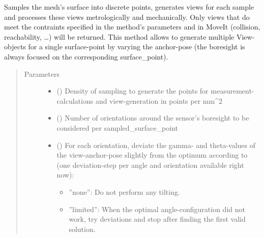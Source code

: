 \documentclass[letterpaper,10pt,english]{sphinxmanual}
\begin{document}
\begin{fulllineitems}
\begin{fulllineitems}
\label{\detokenize{module_trajectory_manager:agiprobot_measurement.trajectory_manager.TrajectoryManager.generate_samples_and_views}}
Samples the mesh’s surface into discrete points, generates views for each sample and processes these views metrologically and mechanically.
Only views that do meet the contraints specified in the method’s parameters and in MoveIt (collision, reachability, …) will be returned. This method allows to generate
multiple View-objects for a single surface-point by varying the anchor-pose (the boresight is always focused on the corresponding surface\_point).
\begin{quote}\begin{description}
\item[{Parameters}] \leavevmode\begin{itemize}
\item {} 
 () \textendash{} Density of sampling to generate the points for measurement-calculations and view-generation in points per mm\textasciicircum{}2

\item {} 
 () \textendash{} Number of orientations around the sensor’s boresight to be considered per sampled\_surface\_point

\item {} 
 (\sphinxstyleliteralemphasis{, }) \textendash{} 
For each orientation, deviate the gamma- and theta-values of the view-anchor-pose slightly from the optimum according to (one deviation-step per angle and orientation available right now):
\begin{itemize}
\item {} 
”none”: Do not perform any tilting.

\item {} 
”limited”: When the optimal angle-configuration did not work, try deviations and stop after finding the first valid solution.


\end{itemize}
\end{itemize}
\end{description}
\end{quote}
\end{fulllineitems}
\end{fulllineitems}
\end{document}
